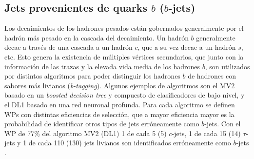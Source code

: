 


\subsection{Jets provenientes de quarks $b$ ($b$-jets)}

Los decaimientos de los hadrones pesados están gobernados generalmente por el hadrón más pesado en la cascada del decaimiento. Un hadrón $b$ generalmente decae a través de una cascada a un hadrón $c$, que a su vez decae a un hadrón $s$, etc. Esto genera la existencia de múltiples 
vértices secundarios, que junto con la información de las trazas y la elevada vida media de los hadrones $b$, son utilizados por distintos algoritmos para poder distinguir los hadrones $b$ de hadrones con sabores más livianos (\textit{b-tagging}). Algunos ejemplos de algoritmos \cite{btag} son el MV2 basado en un \textit{boosted decision tree} y compuesto de clasificadores de bajo nivel, y el DL1 basado en una red neuronal profunda. Para cada algoritmo se definen WPs con distintas eficiencias de selección, que a mayor eficiencia mayor es la probabilidad de identificar otros tipos de jets erróneamente como $b$-jets. Con el WP de 77\% del algoritmo MV2 (DL1) 1 de cada 5 (5) $c$-jets, 1 de cada 15 (14) $\tau$-jets y 1 de cada 110 (130) jets livianos son identificados erróneamente como $b$-jets \cite{btag}.

